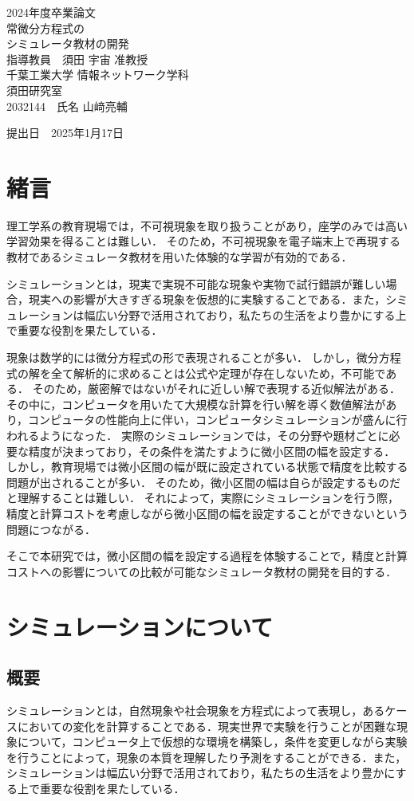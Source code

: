 \documentclass[a4paper, 12pt]{ltjsarticle}
\newcommand{\coverpage}{
\begin{titlepage}
\begin{center}
\vspace*{1.5cm}

{\LARGE 2024年度卒業論文}\\[2cm] %

{\Huge {常微分方程式の\\シミュレータ教材の開発}}\\[4cm] %

{\LARGE 指導教員　須田 宇宙 准教授}\\[2cm] %
{\LARGE 千葉工業大学 情報ネットワーク学科}\\[0.5cm] %

{\LARGE 須田研究室}\\[2.5cm] %

{\LARGE {2032144}　氏名 {山﨑亮輔}} \\[1.5cm] %

\vfill
\end{center}

\begin{flushright}
{\LARGE 提出日　\textnormal{2025年1月17日}}\\[1.5cm] %
\end{flushright}

\vfill
\end{titlepage}
}
\begin{document}
\coverpage

\tableofcontents

\clearpage

\section{緒言}
理工学系の教育現場では，不可視現象を取り扱うことがあり，座学のみでは高い学習効果を得ることは難しい．
そのため，不可視現象を電子端末上で再現する教材であるシミュレータ教材を用いた体験的な学習が有効的である\cite{suda2018}．

シミュレーションとは，現実で実現不可能な現象や実物で試行錯誤が難しい場合，現実への影響が大きすぎる現象を仮想的に実験することである．また，シミュレーションは幅広い分野で活用されており，私たちの生活をより豊かにする上で重要な役割を果たしている．

現象は数学的には微分方程式の形で表現されることが多い．
しかし，微分方程式の解を全て解析的に求めることは公式や定理が存在しないため，不可能である．
そのため，厳密解ではないがそれに近しい解で表現する近似解法がある．
その中に，コンピュータを用いたて大規模な計算を行い解を導く数値解法があり，コンピュータの性能向上に伴い，コンピュータシミュレーションが盛んに行われるようになった．
実際のシミュレーションでは，その分野や題材ごとに必要な精度が決まっており，その条件を満たすように微小区間の幅を設定する．
しかし，教育現場では微小区間の幅が既に設定されている状態で精度を比較する問題が出されることが多い．
そのため，微小区間の幅は自らが設定するものだと理解することは難しい．
それによって，実際にシミュレーションを行う際，精度と計算コストを考慮しながら微小区間の幅を設定することができないという問題につながる．

そこで本研究では，微小区間の幅を設定する過程を体験することで，精度と計算コストへの影響についての比較が可能なシミュレータ教材の開発を目的する．
\clearpage
\section{シミュレーションについて}
\subsection{概要}
シミュレーションとは，自然現象や社会現象を方程式によって表現し，あるケースにおいての変化を計算することである．現実世界で実験を行うことが困難な現象について，コンピュータ上で仮想的な環境を構築し，条件を変更しながら実験を行うことによって，現象の本質を理解したり予測をすることができる．また，シミュレーションは幅広い分野で活用されており，私たちの生活をより豊かにする上で重要な役割を果たしている．
\end{document}
